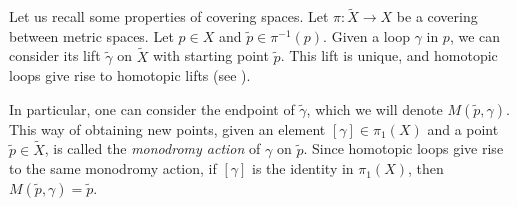 \documentclass[10pt]{article}
\theoremstyle{definition}
\begin{document}
Let us recall some  properties of covering spaces.
Let $\pi:\tilde{X} \to X$ be a covering between metric spaces. Let $p \in X$ and $\tilde{p} \in \pi^{-1}(p)$. Given a loop $\gamma$ in $p$, we can consider its lift $\tilde{\gamma}$ on $\tilde{X}$ with starting point $\tilde{p}$. 
This lift is unique, and homotopic loops give rise to homotopic lifts (see \cite[p.\,60]{Hatcher}). 


In particular, one can consider the endpoint of $\tilde{\gamma}$, which we will denote $M(\tilde{p},\gamma)$. This way of obtaining new points, given an element $[\gamma] \in \pi_1(X)$ 
and a point $\tilde{p} \in \tilde{X}$, is called the \emph{monodromy action} of $\gamma$ on $\tilde{p}$. 
Since homotopic loops give rise to the same monodromy action, if $[\gamma]$ is the identity in $\pi_1(X)$, then $M(\tilde{p},\gamma)=\tilde{p}$.
\end{document}
